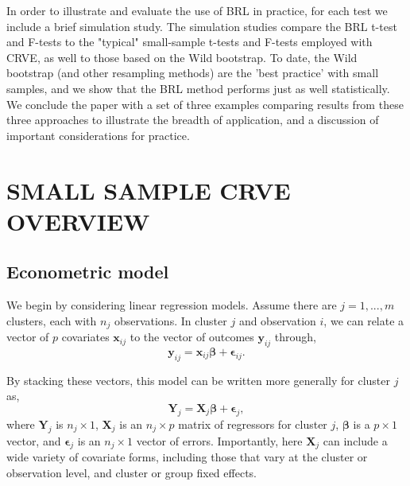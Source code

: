 \documentclass[12pt]{article}
\newcommand{\bm}{\mathbf}
\newcommand{\bs}{\boldsymbol}
\begin{document}
In order to illustrate and evaluate the use of BRL in practice, for each test we include a brief simulation study. The simulation studies compare the BRL t-test and F-tests to the "typical" small-sample t-tests and F-tests employed with CRVE, as well to those based on the Wild bootstrap. 
To date, the Wild bootstrap (and other resampling methods) are the 'best practice' with small samples, and we show that the BRL method performs just as well statistically. We conclude the paper with a set of three examples comparing results from these three approaches to illustrate the breadth of application, and a discussion of important considerations for practice.  


\section{SMALL SAMPLE CRVE OVERVIEW}
\subsection{Econometric model}

We begin by considering linear regression models. Assume there are $j=1,...,m$ clusters, each with $n_j$ observations. In cluster $j$ and observation $i$, we can relate a vector of $p$ covariates $\bm{x}_{ij}$ to the vector of outcomes $\bm{y}_{ij}$ through,
\begin{equation}
\label{eq:model_vector}
\bm{y}_{ij} = \bm{x}_{ij} \bs\beta + \bs\epsilon_{ij}.
\end{equation}

By stacking these vectors, this model can be written more generally for cluster $j$ as,
\begin{equation}
\label{eq:model_vector}
\bm{Y}_j = \bm{X}_j \bs\beta + \bs\epsilon_j,
\end{equation}
where $\bm{Y}_j$ is $n_j \times 1$, $\bm{X}_j$ is an $n_j \times p$ matrix of regressors for cluster $j$, $\bs\beta$ is a $p \times 1$ vector, and $\bs\epsilon_j$ is an $n_j \times 1$ vector of errors. Importantly, here $\bm{X}_j$ can include a wide variety of covariate forms, including those that vary at the cluster or observation level, and cluster or group fixed effects.
\end{document}
